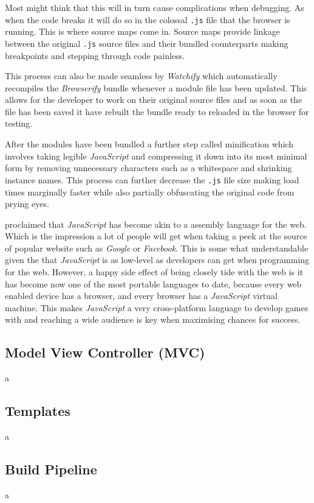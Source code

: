 \documentclass[final]{cmpreport}
\begin{document}
Most might think that this will in turn cause complications when debugging. As when the code breaks it will do so in the colossal \texttt{.js} file that the browser is running. This is where source maps come in. Source maps provide linkage between the original \texttt{.js} source files and their bundled counterparts making breakpoints and stepping through code painless. \cite{Seddon}

This process can also be made seamless by \textit{Watchify} which automatically recompiles the \textit{Browserify} bundle whenever a module file has been updated. This allows for the developer to work on their original source files and as soon as the file has been saved it have rebuilt the bundle ready to reloaded in the browser for testing.

After the modules have been bundled a further step called minification which involves taking legible \textit{JavaScript} and compressing it down into its most minimal form by removing unnecessary characters such as a whitespace and shrinking instance names. This process can further decrease the \texttt{.js} file size making load times marginally faster while also partially obfuscating the original code from prying eyes.

\cite{Hanselman} proclaimed that \textit{JavaScript} has become akin to a assembly language for the web. Which is the impression a lot of people will get when taking a peek at the source of popular website such as \textit{Google} or \textit{Facebook}. This is some what understandable given the that \textit{JavaScript} is as low-level as developers can get when programming for the web. However, a happy side effect of being closely tide with the web is it has become now one of the most portable languages to date, because every web enabled device has a browser, and every browser has a \textit{JavaScript} virtual machine. This makes \textit{JavaScript} a very cross-platform language to develop games with and reaching a wide audience is key when maximising chances for success.

\subsection{Model View Controller (MVC)}
a

\subsection{Templates}
a

\subsection{Build Pipeline}
a
\end{document}
